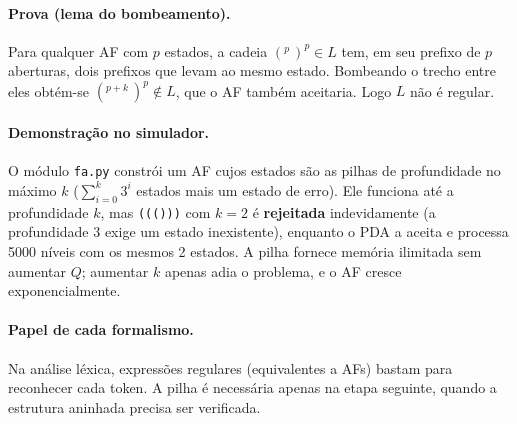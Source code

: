 \documentclass[12pt,a4paper]{article}
\begin{document}
\paragraph{Prova (lema do bombeamento).} Para qualquer AF com $p$ estados, a cadeia $(^p\,)^p \in L$ tem, em seu prefixo de $p$ aberturas, dois prefixos que levam ao mesmo estado. Bombeando o trecho entre eles obtém-se $(^{p+k}\,)^p \notin L$, que o AF também aceitaria. Logo $L$ não é regular.

\paragraph{Demonstração no simulador.} O módulo \texttt{fa.py} constrói um AF cujos estados são as pilhas de profundidade no máximo $k$ ($\sum_{i=0}^{k} 3^i$ estados mais um estado de erro). Ele funciona até a profundidade $k$, mas \texttt{((()))} com $k=2$ é \textbf{rejeitada} indevidamente (a profundidade 3 exige um estado inexistente), enquanto o PDA a aceita e processa 5000 níveis com os mesmos 2 estados. A pilha fornece memória ilimitada sem aumentar $Q$; aumentar $k$ apenas adia o problema, e o AF cresce exponencialmente.

\paragraph{Papel de cada formalismo.} Na análise léxica, expressões regulares (equivalentes a AFs) bastam para reconhecer cada token. A pilha é necessária apenas na etapa seguinte, quando a estrutura aninhada precisa ser verificada.
\end{document}
